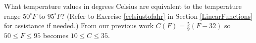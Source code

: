 {What temperature values in degrees Celsius are equivalent to the temperature range $50^{\circ}F$ to $95^{\circ}F$?  (Refer to Exercise \ref{celsiustofahr} in Section \ref{LinearFunctions} for assistance if needed.) }
{From our previous work $C(F) = \frac{5}{9}(F - 32)$ so $50 \leq F \leq 95$ becomes $10 \leq C \leq 35$.
}